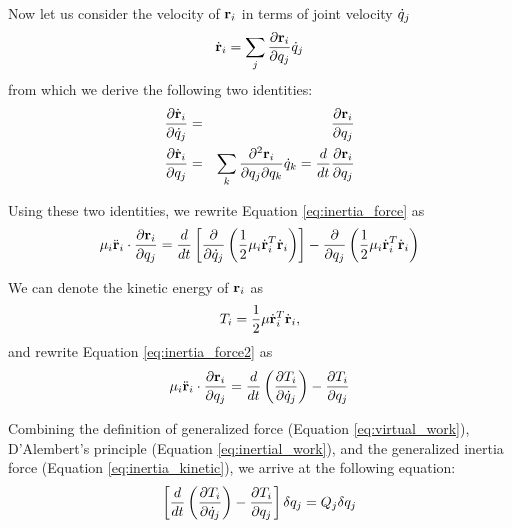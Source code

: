 Now let us consider the velocity of $\mathbf{r}_i$ in terms of
joint velocity $\dot{q}_j$
\begin{equation}
\label{eq:velocity}
\dot{\mathbf{r}}_i = \sum_j \frac{\partial
  \mathbf{r}_i}{\partial q_j} \dot{q}_j
\end{equation}
from which we derive the following two identities:
\begin{eqnarray}
\frac{\partial \dot{\mathbf{r}}_i}{\partial \dot{q}_j} &=&
\frac{\partial \mathbf{r}_i}{\partial q_j}  \\
\frac{\partial \dot{\mathbf{r}}_i}{\partial q_j} &=&
\sum_k \frac{\partial^2 \mathbf{r}_i}{\partial q_j \partial
  q_k} \dot{q}_k = \frac{d}{dt} \frac{\partial \mathbf{r}_i}{\partial q_j}
\end{eqnarray}

Using these two identities, we rewrite Equation \ref{eq:inertia_force} as
\begin{equation}
\label{eq:inertia_force2}
\mathbf{\mu}_i \ddot{\mathbf{r}}_i \cdot \frac{\partial \mathbf{r}_i}{\partial q_j}   = \frac{d}{dt} \left[ \frac{\partial}{\partial \dot{q}_j} \left( \frac{1}{2} \mathbf{\mu}_i \dot{\mathbf{r}}_i^{T} \dot{\mathbf{r}}_i\right) \right]
   - \frac{\partial}{\partial q_j} \left( \frac{1}{2} \mathbf{\mu}_i \dot{\mathbf{r}}_i^{T} \dot{\mathbf{r}}_i \right)
\end{equation}

We can denote the kinetic energy of $\mathbf{r}_i$ as
\begin{equation}\label{eq:kinetic_energy}
    T_i = \frac{1}{2} \mathbf{\mu} \dot{\mathbf{r}}_i^{T}
    \dot{\mathbf{r}}_i,
\end{equation}
and rewrite Equation \ref{eq:inertia_force2} as
\begin{equation}\label{eq:inertia_kinetic}
    \mathbf{\mu}_i \ddot{\mathbf{r}}_i \cdot \frac{\partial \mathbf{r}_i}{\partial
    q_j} = \frac{d}{dt} \left( \frac{\partial T_i}{\partial
    \dot{q}_j}\right) - \frac{\partial T_i}{\partial q_j}
\end{equation}

Combining the definition of generalized force (Equation
\ref{eq:virtual_work}), D'Alembert's principle (Equation
\ref{eq:inertial_work}), and the generalized inertia force (Equation
\ref{eq:inertia_kinetic}), we arrive at the following equation:
\begin{equation}\label{eq:dynamic_equil}
    \left[ \frac{d}{dt} \left( \frac{\partial T_i}{\partial \dot{q}_j} \right) - \frac{\partial T_i}{\partial
    q_j}\right] \delta q_j = Q_{j} \delta
    q_j
\end{equation}

